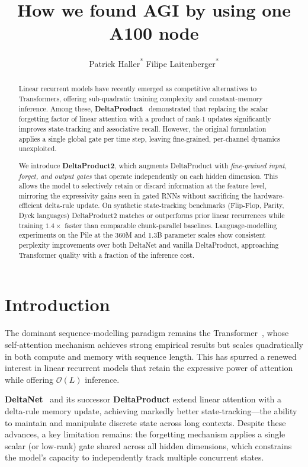 \documentclass[11pt]{article}
\title{How we found AGI by using one A100 node}
\author{
  Patrick Haller\textsuperscript{*} Filipe Laitenberger\textsuperscript{*}
}
\begin{document}
\maketitle

\begin{abstract}
Linear recurrent models have recently emerged as competitive alternatives to
Transformers, offering sub-quadratic training complexity and constant-memory
inference. Among these, \textbf{DeltaProduct}~\cite{vaswani2017attention}
demonstrated that replacing the scalar forgetting factor of linear attention
with a product of rank-1 updates significantly improves state-tracking and
associative recall. However, the original formulation applies a single global
gate per time step, leaving fine-grained, per-channel dynamics unexploited.

We introduce \textbf{DeltaProduct2}, which augments DeltaProduct with
\emph{fine-grained input, forget, and output gates} that operate independently
on each hidden dimension. This allows the model to selectively retain or
discard information at the feature level, mirroring the expressivity gains seen
in gated RNNs without sacrificing the hardware-efficient delta-rule update.
On synthetic state-tracking benchmarks (Flip-Flop, Parity, Dyck languages)
DeltaProduct2 matches or outperforms prior linear recurrences while training
$1.4\times$ faster than comparable chunk-parallel baselines. Language-modelling
experiments on the Pile at the 360M and 1.3B parameter scales show consistent
perplexity improvements over both DeltaNet and vanilla DeltaProduct,
approaching Transformer quality with a fraction of the inference cost.
\end{abstract}

\section{Introduction}

The dominant sequence-modelling paradigm remains the Transformer~\cite{vaswani2017attention},
whose self-attention mechanism achieves strong empirical results but scales
quadratically in both compute and memory with sequence length.
This has spurred a renewed interest in linear recurrent models that retain
the expressive power of attention while offering $\mathcal{O}(L)$ inference.

\textbf{DeltaNet}~\cite{vaswani2017attention} and its successor
\textbf{DeltaProduct} extend linear attention with a delta-rule memory update,
achieving markedly better state-tracking---the ability to maintain and
manipulate discrete state across long contexts.
Despite these advances, a key limitation remains: the forgetting mechanism
applies a single scalar (or low-rank) gate shared across all hidden dimensions,
which constrains the model's capacity to independently track multiple
concurrent states.
\end{document}
